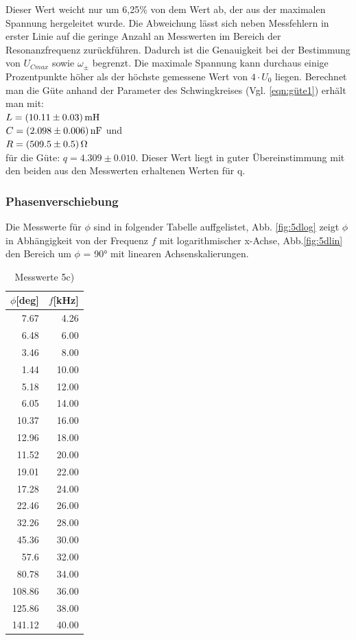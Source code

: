 Dieser Wert weicht nur um 6,25\% von dem Wert ab, der aus der maximalen
Spannung hergeleitet wurde. Die Abweichung lässt sich neben Messfehlern in erster
Linie auf die geringe Anzahl an Messwerten im Bereich der Resonanzfrequenz
zurückführen. Dadurch ist die Genauigkeit bei der Bestimmung von
$U_{Cmax}$ sowie $\omega_\pm$ begrenzt. Die maximale Spannung kann durchaus
einige Prozentpunkte höher als der höchste gemessene Wert von $4\cdot U_0$
liegen.
Berechnet man die Güte anhand der Parameter des Schwingkreises
(Vgl. \ref{eqn:güte1}) erhält man mit: \\
$L = \SI{10.11 +- 0.03}{\milli\henry}$  \\
$C = \SI{2.098 +- 0.006}{\nano\farad}$ und \\
$R = \SI{509.5 +- 0.5}{\ohm}$ \\
für die Güte:
$q = 4.309 \pm 0.010$.
Dieser Wert liegt in guter Übereinstimmung mit den beiden aus den Messwerten
erhaltenen Werten für q.

\subsubsection{Phasenverschiebung}
Die Messwerte für $\phi$ sind in folgender Tabelle auffgelistet, Abb.
\ref{fig:5dlog} zeigt $\phi$ in Abhängigkeit von der Frequenz $f$ mit
logarithmischer x-Achse, Abb.\ref{fig:5dlin} den Bereich um $\phi$ = 90° mit
linearen Achsenskalierungen.
\begin{table}
\centering
\caption{Messwerte 5c)}
\label{tab:5c}
\begin{tabular}{rr}
\toprule
{$\phi$[deg]} &{$f$[kHz]}\\
\midrule
7.67 & 4.26 \\
6.48 & 6.00 \\
3.46 & 8.00 \\
1.44 & 10.00 \\
5.18 & 12.00 \\
6.05 & 14.00 \\
10.37 & 16.00 \\
12.96 & 18.00 \\
11.52 & 20.00 \\
19.01 & 22.00 \\
17.28 & 24.00 \\
22.46 & 26.00 \\
32.26 & 28.00 \\
45.36 & 30.00 \\
57.6 & 32.00 \\
80.78 & 34.00 \\
108.86 & 36.00 \\
125.86 & 38.00 \\
141.12 & 40.00 \\
\bottomrule
\end{tabular}
\end{table}

